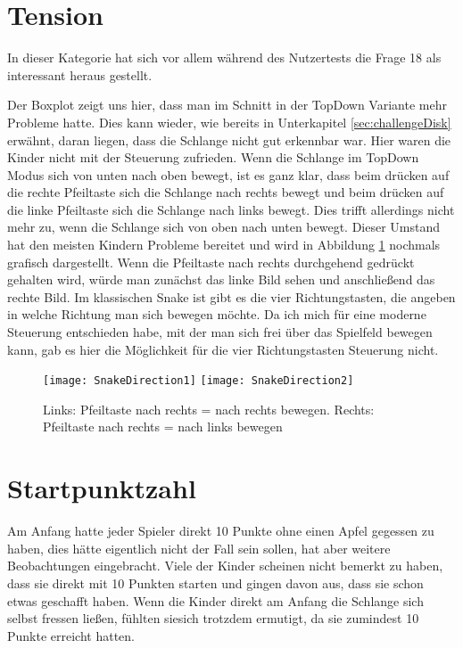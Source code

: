 \section{Tension}
\label{sec:tensionDisk}
In dieser Kategorie hat sich vor allem während des Nutzertests die Frage 18 als interessant heraus gestellt.
\begin{quote}
\end{quote}
Der Boxplot zeigt uns hier, dass man im Schnitt in der TopDown Variante mehr Probleme hatte. Dies kann wieder, wie bereits in Unterkapitel \ref{sec:challengeDisk} erwähnt, daran liegen, dass die Schlange nicht gut erkennbar war. Hier waren die Kinder nicht mit der Steuerung zufrieden. Wenn die Schlange im TopDown Modus sich von unten nach oben bewegt, ist es ganz klar, dass beim drücken auf die rechte Pfeiltaste sich die Schlange nach rechts bewegt und beim drücken auf die linke Pfeiltaste sich die Schlange nach links bewegt. Dies trifft allerdings nicht mehr zu, wenn die Schlange sich von oben nach unten bewegt. Dieser Umstand hat den meisten Kindern Probleme bereitet und wird in Abbildung \ref{fig:controlIssue} nochmals grafisch dargestellt. Wenn die Pfeiltaste nach rechts durchgehend gedrückt gehalten wird, würde man zunächst das linke Bild sehen und anschließend das rechte Bild. Im klassischen Snake ist gibt es die vier Richtungstasten, die angeben in welche Richtung man sich bewegen möchte. Da ich mich für eine moderne Steuerung entschieden habe, mit der man sich frei über das Spielfeld bewegen kann, gab es hier die Möglichkeit für die vier Richtungstasten Steuerung nicht.
\begin{figure}[htb]
	\centering
	\texttt{[image: SnakeDirection1]}
	\texttt{[image: SnakeDirection2]}
	\caption{Links: Pfeiltaste nach rechts = nach rechts bewegen. Rechts: Pfeiltaste nach rechts = nach links bewegen\label{fig:controlIssue}}
\end{figure}
\section{Startpunktzahl}
\label{sec:startpointsDisk}
Am Anfang hatte jeder Spieler direkt 10 Punkte ohne einen Apfel gegessen zu haben, dies hätte eigentlich nicht der Fall sein sollen, hat aber weitere Beobachtungen eingebracht. Viele der Kinder scheinen nicht bemerkt zu haben, dass sie direkt mit 10 Punkten starten und gingen davon aus, dass sie schon etwas geschafft haben. Wenn die Kinder direkt am Anfang die Schlange sich selbst fressen ließen, fühlten siesich trotzdem ermutigt, da sie zumindest 10 Punkte erreicht hatten.
